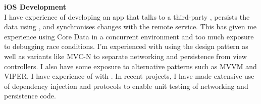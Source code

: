 \textbf{iOS Development}\\
I have experience of developing an app that talks to a third-party
, persists the data using , and
synchronises changes with the remote service. This has given me experience using
Core Data in a concurrent environment and too much exposure to debugging race
conditions. I'm experienced with using the  design pattern as well as
variants like MVC-N to separate networking and persistence from view
controllers. I also have some exposure to alternative patterns such as MVVM and
VIPER. I have experience of  with . In recent
projects, I have made extensive use of dependency injection and protocols to
enable unit testing of networking and persistence code.

